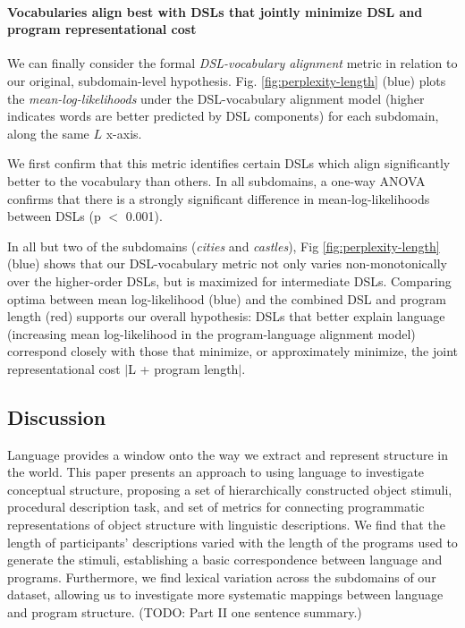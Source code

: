 \documentclass[10pt,letterpaper]{article}
\begin{document}
\paragraph{Vocabularies align best with DSLs that jointly minimize DSL and program representational cost} We can finally consider the formal \textit{DSL-vocabulary alignment} metric in relation to our original, subdomain-level hypothesis. Fig. \ref{fig:perplexity-length} (blue) plots the \textit{mean-log-likelihoods} under the DSL-vocabulary alignment model (higher indicates words are better predicted by DSL components) for each subdomain, along the same $L$ x-axis.

We first confirm that this metric identifies certain DSLs which align significantly better to the vocabulary than others. In all subdomains, a one-way ANOVA confirms that there is a strongly significant difference in mean-log-likelihoods between DSLs (p $<$ 0.001). 

In all but two of the subdomains (\textit{cities} and \textit{castles}), Fig \ref{fig:perplexity-length} (blue) shows that our DSL-vocabulary metric not only varies non-monotonically over the higher-order DSLs, but is maximized for intermediate DSLs. Comparing optima between mean log-likelihood (blue) and the combined DSL and program length (red) supports our overall hypothesis: DSLs that better explain language (increasing mean log-likelihood in the program-language alignment model) correspond closely with those that minimize, or approximately minimize, the joint representational cost $|$L + program length$|$.


\subsection{Discussion}

Language provides a window onto the way we extract and represent structure in the world.
This paper presents an approach to using language to investigate conceptual structure, proposing a set of hierarchically constructed object stimuli, procedural description task, and set of metrics for connecting programmatic representations of object structure with linguistic descriptions.
We find that the length of participants' descriptions varied with the length of the programs used to generate the stimuli, establishing a basic correspondence between language and programs.
Furthermore, we find lexical variation across the subdomains of our dataset, allowing us to investigate more systematic mappings between language and program structure.
(TODO: Part II one sentence summary.)
\end{document}
